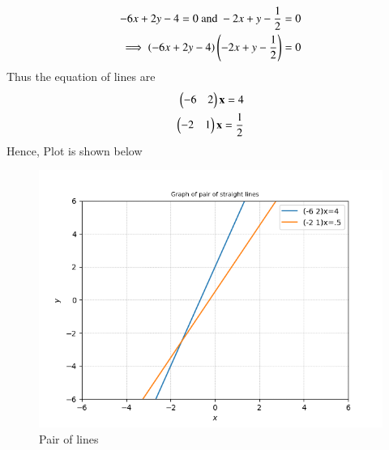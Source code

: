\documentclass[journal,12pt,twocolumn]{IEEEtran}
\begin{document}
\begin{align}
	\label{eq22}-6x + 2y - 4 = 0 \text{ and } -2x + y -\frac{1}{2} = 0\\
	\implies \left(-6x + 2y - 4\right)\left(-2x + y -\frac{1}{2}\right) = 0
\end{align}
Thus the equation of lines are
\begin{align}
\begin{pmatrix}-6&2\end{pmatrix}\mathbf{x} = 4\\ 
\begin{pmatrix}-2&1\end{pmatrix}\mathbf{x} = \frac{1}{2}
\end{align}
Hence, Plot is shown below 
\begin{figure}[ht!]
\centering
\includegraphics[width=\columnwidth]{Figure.png}
\caption{Pair of lines}
\end{figure}

\end{document}
